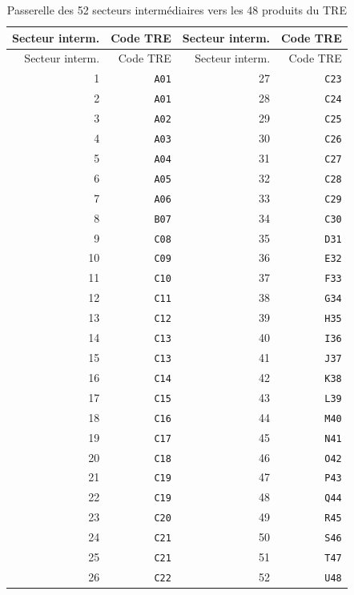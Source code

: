 \documentclass[11pt,a4paper]{article}
\begin{document}
\begin{longtable}{rr@{\hspace{1.6cm}}rr}
\caption{Passerelle des 52 secteurs intermédiaires vers les 48 produits du TRE}
\label{tab:mapping-52-48}\\
\toprule
Secteur interm. & Code TRE & Secteur interm. & Code TRE \\
\midrule
\endfirsthead
\toprule
Secteur interm. & Code TRE & Secteur interm. & Code TRE \\
\midrule
\endhead
1  & \texttt{A01} & 27 & \texttt{C23} \\
2  & \texttt{A01} & 28 & \texttt{C24} \\
3  & \texttt{A02} & 29 & \texttt{C25} \\
4  & \texttt{A03} & 30 & \texttt{C26} \\
5  & \texttt{A04} & 31 & \texttt{C27} \\
6  & \texttt{A05} & 32 & \texttt{C28} \\
7  & \texttt{A06} & 33 & \texttt{C29} \\
8  & \texttt{B07} & 34 & \texttt{C30} \\
9  & \texttt{C08} & 35 & \texttt{D31} \\
10 & \texttt{C09} & 36 & \texttt{E32} \\
11 & \texttt{C10} & 37 & \texttt{F33} \\
12 & \texttt{C11} & 38 & \texttt{G34} \\
13 & \texttt{C12} & 39 & \texttt{H35} \\
14 & \texttt{C13} & 40 & \texttt{I36} \\
15 & \texttt{C13} & 41 & \texttt{J37} \\
16 & \texttt{C14} & 42 & \texttt{K38} \\
17 & \texttt{C15} & 43 & \texttt{L39} \\
18 & \texttt{C16} & 44 & \texttt{M40} \\
19 & \texttt{C17} & 45 & \texttt{N41} \\
20 & \texttt{C18} & 46 & \texttt{O42} \\
21 & \texttt{C19} & 47 & \texttt{P43} \\
22 & \texttt{C19} & 48 & \texttt{Q44} \\
23 & \texttt{C20} & 49 & \texttt{R45} \\
24 & \texttt{C21} & 50 & \texttt{S46} \\
25 & \texttt{C21} & 51 & \texttt{T47} \\
26 & \texttt{C22} & 52 & \texttt{U48} \\
\bottomrule
\end{longtable}
\end{document}
